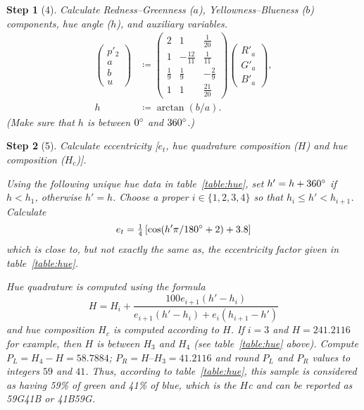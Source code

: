 \documentclass[twocolumn]{scrartcl}
\theoremstyle{named}
\newtheorem*{step}{Step}
\begin{document}
\begin{step}[4]
Calculate Redness--Greenness ($a$), Yellowness--Blueness ($b$) components,
hue angle ($h$), and auxiliary variables.
\begin{align*}
  \begin{pmatrix}
    p'_2\\[0.5ex]
    a\\[0.5ex]
    b\\[0.5ex]
    u
  \end{pmatrix}
  &\coloneqq
  \begin{pmatrix}
    2 & 1 & \tfrac{1}{20}\\[0.5ex]
    1 & -\tfrac{12}{11} & \tfrac{1}{11}\\[0.5ex]
    \tfrac{1}{9} & \tfrac{1}{9} & -\tfrac{2}{9}\\[0.5ex]
    1 & 1 & \tfrac{21}{20}
  \end{pmatrix}
  \begin{pmatrix}
    R'_a\\G'_a\\B'_a
  \end{pmatrix},\\
  h&\coloneqq \arctan(b/a).
\end{align*}
(Make sure that $h$ is between $0\degree$ and $360\degree$.)
\end{step}

\begin{step}[5]
Calculate eccentricity [$e_t$, hue quadrature composition
($H$) and hue composition ($H_c$)].

Using the following unique hue data in table~\ref{table:hue}, set
$h'= h + 360\degree$ if $h < h_1$, otherwise $h'=h$.
Choose a proper $i\in\{1,2,3,4\}$ so that $h_i\le h' < h_{i+1}$.
Calculate
\[
  e_t = \tfrac{1}{4}
  \left[
    \cos(h'\pi/180\degree + 2) + 3.8
  \right]
\]
which is close to, but not exactly the same as, the eccentricity factor given
in table~\ref{table:hue}.

Hue quadrature is computed using the formula
\[
  H = H_i + \frac{100 e_{i+1} (h'-h_i)}{e_{i+1}(h'-h_i) + e_i (h_{i+1}-h')}
\]
and hue composition $H_c$ is computed according to $H$.  If $i=3$ and $H =
241.2116$ for example, then $H$ is between $H_3$ and $H_4$ (see
table~\ref{table:hue} above). Compute $P_L=H_4-H = 58.7884$; $P_R = H – H_3 =
41.2116$ and round $P_L$ and $P_R$ values to integers $59$ and $41$. Thus,
according to table~\ref{table:hue}, this sample is considered as having 59\%
of green and 41\% of blue, which is the $H$c and can be reported as 59G41B or
41B59G.
\end{step}
\end{document}
